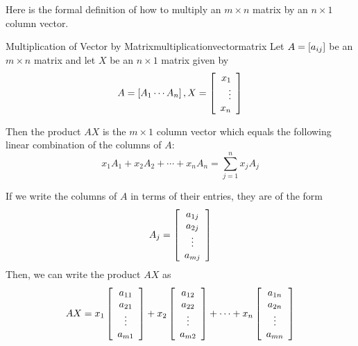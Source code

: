 Here is the formal definition of how to multiply an $m\times
n $ matrix by an $ n\times 1 $ column vector.

\begin{definition}{Multiplication of Vector by Matrix}{multiplicationvectormatrix}
Let $A=\left[ a_{ij} \right]$ be an $m\times n$ matrix and let $X$
be an $n\times 1$ matrix given by 
\begin{equation*}
A=\left[ A_{1} \cdots A_{n}\right],  X = \left[
\begin{array}{r}
x_{1} \\
\vdots \\
x_{n}
\end{array}
\right] 
\end{equation*}

Then the product $AX$ is the $m\times 1$ column
vector which equals the following
linear combination of the columns of $A$:
\begin{equation*}
x_{1}A_{1}+x_{2}A_{2}+\cdots +x_{n}A_{n} = 
\sum_{j=1}^{n}x_{j}A_{j}  
\end{equation*}
\end{definition}

If we write the columns of $A$ in terms of their entries, they are of the form
\begin{equation*}
A_{j}  =
\left[
\begin{array}{c}
a_{1j} \\
a_{2j} \\
\vdots \\
a_{mj}
\end{array}
\right] 
\end{equation*}
Then, we can write the product $AX$ as
\begin{equation*}
AX = 
x_{1}\left[
\begin{array}{c}
a_{11} \\
a_{21} \\
\vdots \\
a_{m1}
\end{array}
\right] + x_{2}\left[
\begin{array}{c}
a_{12} \\
a_{22} \\
\vdots \\
a_{m2}
\end{array}
\right] +\cdots + x_{n}\left[
\begin{array}{c}
a_{1n} \\
a_{2n} \\
\vdots \\
a_{mn}
\end{array}
\right] 
\end{equation*}

